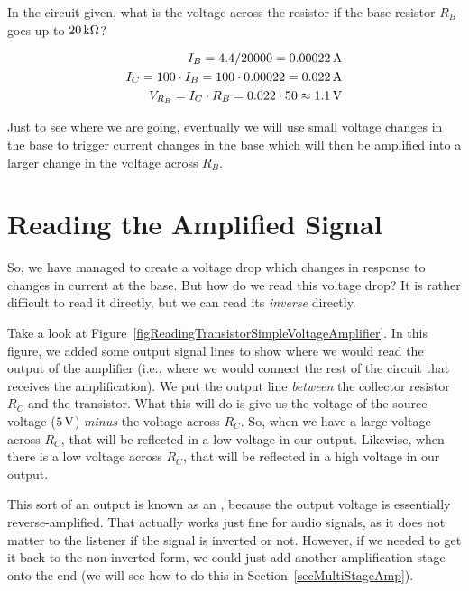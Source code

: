 \begin{exampleprob}
In the circuit given, what is the voltage across the resistor if the base resistor $R_B$ goes up to $20\,\si{\kilo\ohm}$?

\begin{align*}
I_B = 4.4 / 20000 = 0.00022 \,\si{\ampere} \\
I_C = 100 \cdot I_B = 100\cdot 0.00022 = 0.022\,\si{\ampere} \\
V_{R_B} = I_C \cdot R_B = 0.022 \cdot 50 \approx 1.1\,\si{\volt}
\end{align*}
\end{exampleprob}

Just to see where we are going, eventually we will use small voltage changes in the base to trigger current changes in the base which will then be amplified into a larger change in the voltage across $R_B$.

\section{Reading the Amplified Signal}

So, we have managed to create a voltage drop which changes in response to changes in current at the base.
But how do we read this voltage drop?
It is rather difficult to read it directly, but we can read its \emph{inverse} directly.


Take a look at Figure~\ref{figReadingTransistorSimpleVoltageAmplifier}.
In this figure, we added some output signal lines to show where we would read the output of the amplifier (i.e., where we would connect the rest of the circuit that receives the amplification).
We put the output line \emph{between} the collector resistor $R_C$ and the transistor.
What this will do is give us the voltage of the source voltage ($5\,\si{\volt}$) \emph{minus} the voltage across $R_C$.
So, when we have a large voltage across $R_C$, that will be reflected in a low voltage in our output.
Likewise, when there is a low voltage across $R_C$, that will be reflected in a high voltage in our output.

This sort of an output is known as an , because the output voltage is essentially reverse-amplified.
That actually works just fine for audio signals, as it does not matter to the listener if the signal is inverted or not.
However, if we needed to get it back to the non-inverted form, we could just add another amplification stage onto the end (we will see how to do this in Section~\ref{secMultiStageAmp}).

